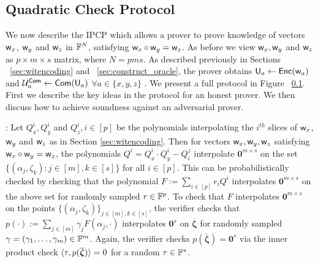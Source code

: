 \subsection{Quadratic Check Protocol}
We now describe the IPCP which allows a prover to prove knowledge of vectors
$\mathsf{w}_x$, $\mathsf{w}_y$ and $\mathsf{w}_z$ in $\mathbb{F}^N$, satisfying $\mathsf{w}_x\circ \mathsf{w}_y =
\mathsf{w}_z$. As before we view $\mathsf{w}_x, \mathsf{w}_y$ and $\mathsf{w}_z$ as $p \times m \times s$ matrix, where $N=pms$. 
As described previously in Sections ~\ref{sec:witencoding} and ~\ref{sec:construct_oracle}, the prover obtains $\mathsf{U}_a \leftarrow \mathsf{Enc}(\mathsf{w}_a)$ and $\mathcal{U}^{\mathsf{Com}}_a \leftarrow \mathsf{Com}(\mathsf{U}_a)$ $\forall a\in \{x,y,z\}$ . We present a full protocol in Figure ~\ref{}. First we describe the key ideas in the protocol for an honest prover. We then discuss how to achieve soundness against an adversarial prover.


: Let $Q^i_x,Q^i_y$ and $Q^i_z, i\in [p]$ be the
polynomials interpolating the $i^{th}$ slices of $\mathsf{w}_x$, $\mathsf{w}_y$ and $\mathsf{w}_z$
 as in Section \ref{sec:witencoding}. Then for vectors $\mathsf{w}_x,\mathsf{w}_y,\mathsf{w}_z$ satisfying
$\mathsf{w}_x\circ \mathsf{w}_y=\mathsf{w}_z$, the polynomials $Q^i=Q^i_x\cdot Q^i_y - Q^z_i$ interpolate
$\bm{0}^{m\times s}$ on the set $\{(\alpha_j,\zeta_k):j\in [m],k\in [s]\}$ for all $i\in [p]$. This can be probabilistically
checked by checking that the polynomial $F := \sum_{i\in [p]}r_iQ^i$ interpolates
$\bm{0}^{m\times s}$ on the above set for randomly sampled $r\in \mathbb{F}^p$. 
To check that $F$ interpolates $\bm{0}^{m\times s}$ on the points
$\{(\alpha_j,\zeta_k)\}_{j\in [m],k\in [s]}$, the verifier checks that
$p(\cdot) := \sum_{j\in [m]}\gamma_jF(\alpha_j,\cdot)$ interpolates $\bm{0}^s$ on
$\overline{\bm{\zeta}}$ for randomly sampled $\gamma=(\gamma_1,\ldots,\gamma_m)\in \mathbb{F}^m$.
Again, the verifier checks $p(\overline{\bm{\zeta}})=\bm{0}^s$ via the inner product
check $\langle \tau,p(\overline{\bm{\zeta}})\rangle=0$ for a random $\tau\in \mathbb{F}^s$. 

